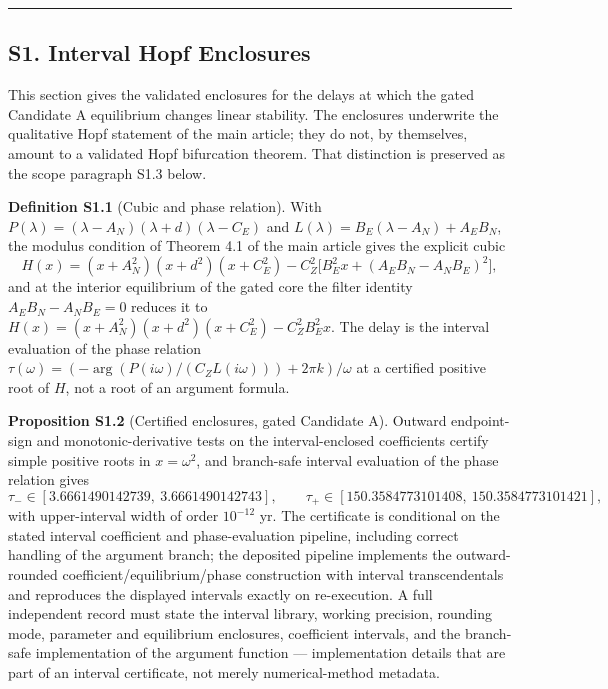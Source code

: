 \documentclass[
  10pt,
  a4paper,
]{article}
\begin{document}
\begin{center}\rule{0.5\linewidth}{0.5pt}\end{center}

\subsection{S1. Interval Hopf
Enclosures}\label{s1.-interval-hopf-enclosures}

This section gives the validated enclosures for the delays at which the
gated Candidate A equilibrium changes linear stability. The enclosures
underwrite the qualitative Hopf statement of the main article; they do
not, by themselves, amount to a validated Hopf bifurcation theorem. That
distinction is preserved as the scope paragraph S1.3 below.

\textbf{Definition S1.1} (Cubic and phase relation). With
\(P(\lambda) = (\lambda - A_N)(\lambda + d)(\lambda - C_E)\) and
\(L(\lambda) = B_E(\lambda - A_N) + A_E B_N\), the modulus condition of
Theorem 4.1 of the main article gives the explicit cubic
\[H(x) = (x + A_N^2)(x + d^2)(x + C_E^2) - C_Z^2\bigl[B_E^2 x + (A_E B_N - A_N B_E)^2\bigr],\]
and at the interior equilibrium of the gated core the filter identity
\(A_E B_N - A_N B_E = 0\) reduces it to
\(H(x) = (x + A_N^2)(x + d^2)(x + C_E^2) - C_Z^2 B_E^2 x\). The delay is
the interval evaluation of the phase relation
\(\tau(\omega) = (-\arg(P(i\omega)/(C_Z L(i\omega))) + 2\pi k)/\omega\)
at a certified positive root of \(H\), not a root of an argument
formula.

\textbf{Proposition S1.2} (Certified enclosures, gated Candidate A).
Outward endpoint-sign and monotonic-derivative tests on the
interval-enclosed coefficients certify simple positive roots in
\(x = \omega^2\), and branch-safe interval evaluation of the phase
relation gives
\[\tau_- \in [3.6661490142739,\ 3.6661490142743], \qquad \tau_+ \in [150.3584773101408,\ 150.3584773101421],\]
with upper-interval width of order \(10^{-12}\) yr. The certificate is
conditional on the stated interval coefficient and phase-evaluation
pipeline, including correct handling of the argument branch; the
deposited pipeline implements the outward-rounded
coefficient/equilibrium/phase construction with interval transcendentals
and reproduces the displayed intervals exactly on re-execution. A full
independent record must state the interval library, working precision,
rounding mode, parameter and equilibrium enclosures, coefficient
intervals, and the branch-safe implementation of the argument function
--- implementation details that are part of an interval certificate, not
merely numerical-method metadata.
\end{document}
